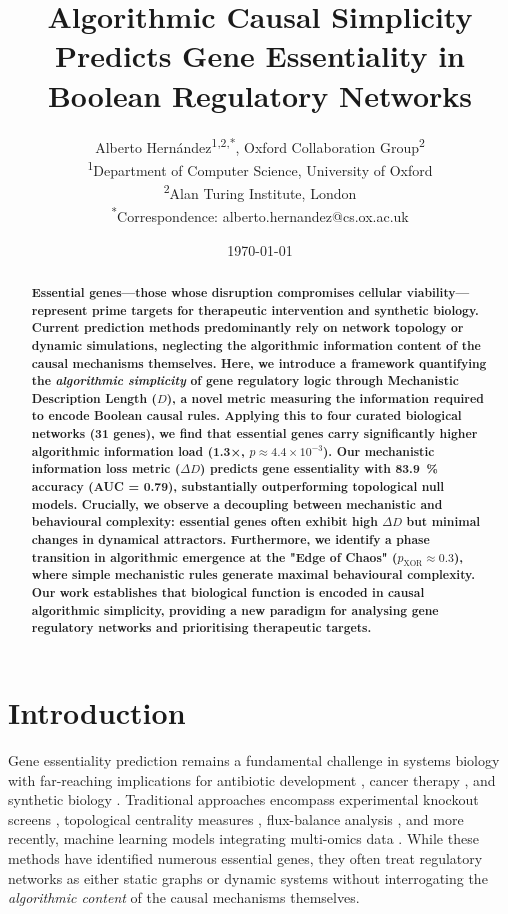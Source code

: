 \documentclass[12pt]{article}
\title{Algorithmic Causal Simplicity Predicts Gene Essentiality in Boolean Regulatory Networks}
\author{Alberto Hernández\textsuperscript{1,2,*}, Oxford Collaboration Group\textsuperscript{2} \\
\small \textsuperscript{1}Department of Computer Science, University of Oxford \\
\small \textsuperscript{2}Alan Turing Institute, London \\
\small \textsuperscript{*}Correspondence: alberto.hernandez@cs.ox.ac.uk}
\date{\today}
\begin{document}
\maketitle

\begin{abstract}
\textbf{Essential genes—those whose disruption compromises cellular viability—represent prime targets for therapeutic intervention and synthetic biology. Current prediction methods predominantly rely on network topology or dynamic simulations, neglecting the algorithmic information content of the causal mechanisms themselves. Here, we introduce a framework quantifying the \textit{algorithmic simplicity} of gene regulatory logic through Mechanistic Description Length (\(D\)), a novel metric measuring the information required to encode Boolean causal rules. Applying this to four curated biological networks (31 genes), we find that essential genes carry significantly higher algorithmic information load (1.3×, \(p \approx 4.4\times10^{-3}\)). Our mechanistic information loss metric (\(\Delta D\)) predicts gene essentiality with \SI{83.9}{\percent} accuracy (AUC = 0.79), substantially outperforming topological null models. Crucially, we observe a decoupling between mechanistic and behavioural complexity: essential genes often exhibit high \(\Delta D\) but minimal changes in dynamical attractors. Furthermore, we identify a phase transition in algorithmic emergence at the "Edge of Chaos" (\(p_{\mathrm{XOR}} \approx 0.3\)), where simple mechanistic rules generate maximal behavioural complexity. Our work establishes that biological function is encoded in causal algorithmic simplicity, providing a new paradigm for analysing gene regulatory networks and prioritising therapeutic targets.}
\end{abstract}

\section{Introduction}

Gene essentiality prediction remains a fundamental challenge in systems biology with far-reaching implications for antibiotic development \cite{Roemer2011}, cancer therapy \cite{Hart2015}, and synthetic biology \cite{Cameron2014}. Traditional approaches encompass experimental knockout screens \cite{Giaever2002}, topological centrality measures \cite{Jeong2001}, flux-balance analysis \cite{Orth2010}, and more recently, machine learning models integrating multi-omics data \cite{Kim2019}. While these methods have identified numerous essential genes, they often treat regulatory networks as either static graphs or dynamic systems without interrogating the \textit{algorithmic content} of the causal mechanisms themselves.
\end{document}
